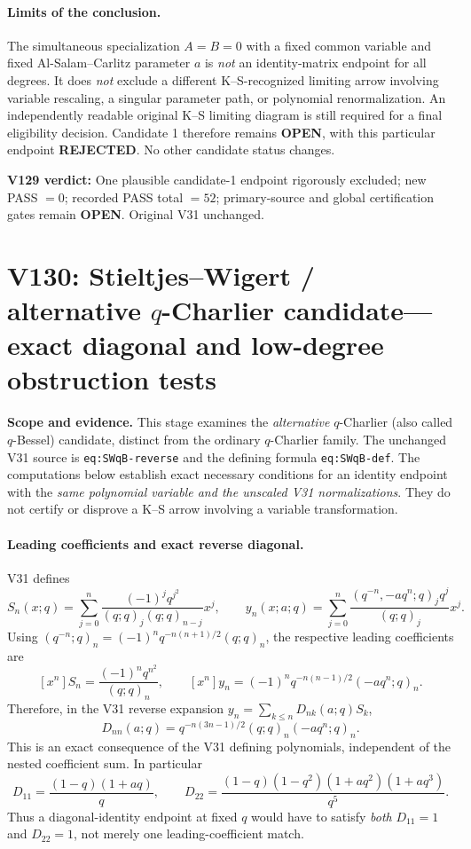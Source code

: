\documentclass[11pt]{article}
\begin{document}
\paragraph{Limits of the conclusion.} The simultaneous specialization $A=B=0$ with a fixed common variable and fixed Al-Salam--Carlitz parameter $a$ is \emph{not} an identity-matrix endpoint for all degrees. It does \emph{not} exclude a different K--S-recognized limiting arrow involving variable rescaling, a singular parameter path, or polynomial renormalization. An independently readable original K--S limiting diagram is still required for a final eligibility decision. Candidate 1 therefore remains \textbf{OPEN}, with this particular endpoint \textbf{REJECTED}. No other candidate status changes.

\noindent\textbf{V129 verdict:} One plausible candidate-1 endpoint rigorously excluded; new PASS $=0$; recorded PASS total $=52$; primary-source and global certification gates remain \textbf{OPEN}. Original V31 unchanged.



\section{V130: Stieltjes--Wigert / alternative $q$-Charlier candidate---exact diagonal and low-degree obstruction tests}
\noindent\textbf{Scope and evidence.} This stage examines the \emph{alternative} $q$-Charlier (also called $q$-Bessel) candidate, distinct from the ordinary $q$-Charlier family. The unchanged V31 source is \texttt{eq:SWqB-reverse} and the defining formula \texttt{eq:SWqB-def}. The computations below establish exact necessary conditions for an identity endpoint with the \emph{same polynomial variable and the unscaled V31 normalizations}. They do not certify or disprove a K--S arrow involving a variable transformation.

\paragraph{Leading coefficients and exact reverse diagonal.}
V31 defines
\[
 S_n(x;q)=\sum_{j=0}^n\frac{(-1)^j q^{j^2}}{(q;q)_j(q;q)_{n-j}}x^j,
 \qquad
 y_n(x;a;q)=\sum_{j=0}^n\frac{(q^{-n},-aq^n;q)_j q^j}{(q;q)_j}x^j.
\]
Using $(q^{-n};q)_n=(-1)^n q^{-n(n+1)/2}(q;q)_n$, the respective leading coefficients are
\[
 [x^n]S_n=\frac{(-1)^n q^{n^2}}{(q;q)_n},\qquad
 [x^n]y_n=(-1)^n q^{-n(n-1)/2}(-aq^n;q)_n.
\]
Therefore, in the V31 reverse expansion $y_n=\sum_{k\le n}D_{nk}(a;q)S_k$,
\begin{equation}\label{eq:v130-diagonal}
 \boxed{D_{nn}(a;q)=q^{-n(3n-1)/2}(q;q)_n(-aq^n;q)_n.}
\end{equation}
This is an exact consequence of the V31 defining polynomials, independent of the nested coefficient sum. In particular
\[
 D_{11}=\frac{(1-q)(1+aq)}q,\qquad
 D_{22}=\frac{(1-q)(1-q^2)(1+aq^2)(1+aq^3)}{q^5}.
\]
Thus a diagonal-identity endpoint at fixed $q$ would have to satisfy \emph{both} $D_{11}=1$ and $D_{22}=1$, not merely one leading-coefficient match.
\end{document}
